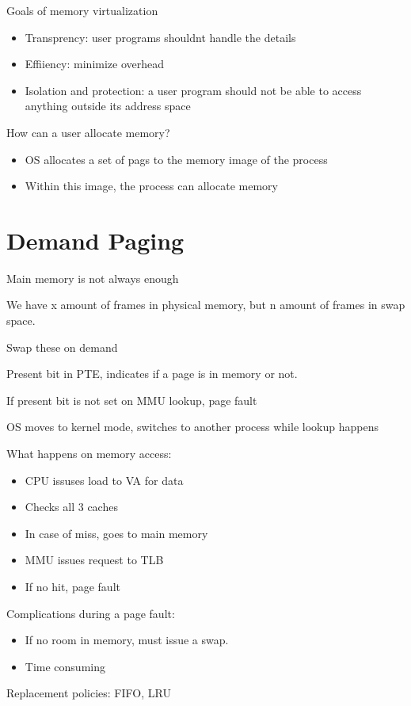 \documentclass[12pt]{article}
\begin{document}
Goals of memory virtualization
\begin{itemize}
    \item Transprency: user programs shouldnt handle the details
    \item Effiiency: minimize overhead
    \item Isolation and protection: a user program should not be able to access anything outside its address space
\end{itemize}

How can a user allocate memory?
\begin{itemize}
    \item OS allocates a set of pags to the memory image of the process
    \item Within this image, the process can allocate memory
\end{itemize}
\newpage
\section{Demand Paging}

Main memory is not always enough

We have x amount of frames in physical memory, but n amount of frames in swap space.

Swap these on demand

Present bit in PTE, indicates if a page is in memory or not.

If present bit is not set on MMU lookup, page fault

OS moves to kernel mode, switches to another process while lookup happens

What happens on memory access:
\begin{itemize}
    \item CPU issuses load to VA for data
    \item Checks all 3 caches
    \item In case of miss, goes to main memory
    \item MMU issues request to TLB
    \item If no hit, page fault
\end{itemize}

Complications during a page fault:
\begin{itemize}
    \item If no room in memory, must issue a swap.
    \item Time consuming
\end{itemize}

Replacement policies: FIFO, LRU
\end{document}
